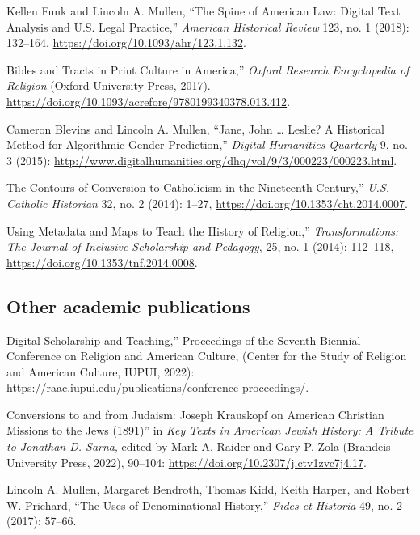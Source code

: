 \documentclass[11pt]{article}
\begin{document}
Kellen Funk and Lincoln A. Mullen, ``The Spine of American Law: Digital Text Analysis and U.S. Legal Practice,'' \emph{American Historical Review} 123, no.  1 (2018): 132--164, \url{https://doi.org/10.1093/ahr/123.1.132}.

\noindent{}Bibles and Tracts in Print Culture in America,'' \emph{Oxford Research Encyclopedia of Religion} (Oxford University Press, 2017). \url{https://doi.org/10.1093/acrefore/9780199340378.013.412}.

Cameron Blevins and Lincoln A. Mullen, ``Jane, John \ldots{} Leslie? A Historical Method for Algorithmic Gender Prediction,'' \emph{Digital Humanities Quarterly} 9, no. 3 (2015): \url{http://www.digitalhumanities.org/dhq/vol/9/3/000223/000223.html}. 

\noindent{}The Contours of Conversion to Catholicism in the Nineteenth Century,'' \emph{U.S. Catholic Historian} 32, no. 2 (2014): 1--27, \url{https://doi.org/10.1353/cht.2014.0007}. 

\noindent{}Using Metadata and Maps to Teach the History of Religion,'' \emph{Transformations: The Journal of Inclusive Scholarship and Pedagogy}, 25, no. 1 (2014): 112--118, \url{https://doi.org/10.1353/tnf.2014.0008}.


\subsection{Other academic publications}\label{Other publications}

\noindent{}Digital Scholarship and Teaching,'' Proceedings of the Seventh Biennial Conference on Religion and American Culture, (Center for the Study of Religion and American Culture, IUPUI, 2022): \url{https://raac.iupui.edu/publications/conference-proceedings/}.

\noindent{}Conversions to and from Judaism: Joseph Krauskopf on American Christian Missions to the Jews (1891)'' in \emph{Key Texts in American Jewish History: A Tribute to Jonathan D. Sarna}, edited by Mark A. Raider and Gary P. Zola (Brandeis University Press, 2022), 90--104: \url{https://doi.org/10.2307/j.ctv1zvc7j4.17}.

Lincoln A. Mullen, Margaret Bendroth, Thomas Kidd, Keith Harper, and Robert W.  Prichard, ``The Uses of Denominational History,'' \emph{Fides et Historia} 49, no. 2 (2017): 57--66.
\end{document}
